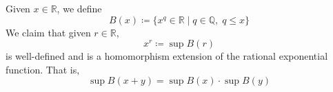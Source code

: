     \begin{corollary}
      Given $x\in \mathbb{R}$, we define 
      \begin{equation}
        B(x) \coloneqq \{ x^q \in \mathbb{R} \mid q \in \mathbb{Q}, \; q \leq x \}
      \end{equation}
      We claim that given $r \in \mathbb{R}$, 
      \begin{equation}
        x^r \coloneqq \sup B(r)
      \end{equation}
      is well-defined and is a homomorphism extension of the rational exponential function. That is, 
      \begin{equation}
        \sup{B(x + y)} = \sup{B(x)} \cdot \sup{B(y)}
      \end{equation}
    \end{corollary}
